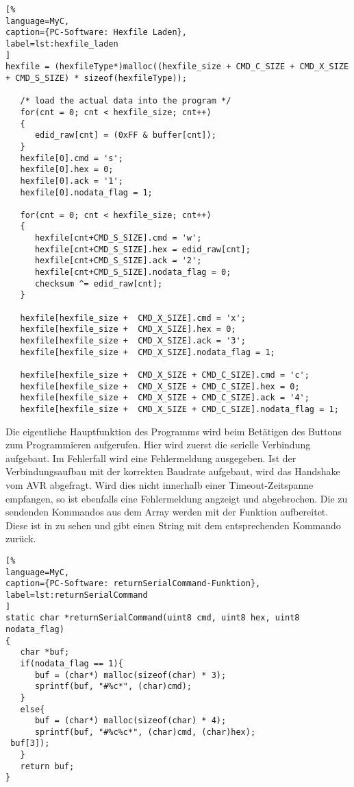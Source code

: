 \begin{lstlisting}[%
language=MyC,
caption={PC-Software: Hexfile Laden},
label=lst:hexfile_laden
]
hexfile = (hexfileType*)malloc((hexfile_size + CMD_C_SIZE + CMD_X_SIZE + CMD_S_SIZE) * sizeof(hexfileType));

   /* load the actual data into the program */
   for(cnt = 0; cnt < hexfile_size; cnt++)
   {
      edid_raw[cnt] = (0xFF & buffer[cnt]);
   }
   hexfile[0].cmd = 's';
   hexfile[0].hex = 0;
   hexfile[0].ack = '1';
   hexfile[0].nodata_flag = 1;

   for(cnt = 0; cnt < hexfile_size; cnt++)
   {
      hexfile[cnt+CMD_S_SIZE].cmd = 'w';
      hexfile[cnt+CMD_S_SIZE].hex = edid_raw[cnt];
      hexfile[cnt+CMD_S_SIZE].ack = '2';
      hexfile[cnt+CMD_S_SIZE].nodata_flag = 0;
      checksum ^= edid_raw[cnt];
   }

   hexfile[hexfile_size +  CMD_X_SIZE].cmd = 'x';
   hexfile[hexfile_size +  CMD_X_SIZE].hex = 0;
   hexfile[hexfile_size +  CMD_X_SIZE].ack = '3';
   hexfile[hexfile_size +  CMD_X_SIZE].nodata_flag = 1;

   hexfile[hexfile_size +  CMD_X_SIZE + CMD_C_SIZE].cmd = 'c';
   hexfile[hexfile_size +  CMD_X_SIZE + CMD_C_SIZE].hex = 0;
   hexfile[hexfile_size +  CMD_X_SIZE + CMD_C_SIZE].ack = '4';
   hexfile[hexfile_size +  CMD_X_SIZE + CMD_C_SIZE].nodata_flag = 1;
\end{lstlisting}%
Die eigentliche Hauptfunktion des Programms wird beim Betätigen des Buttons zum Programmieren aufgerufen. Hier wird zuerst die serielle Verbindung aufgebaut. Im Fehlerfall wird eine Fehlermeldung ausgegeben. Ist der Verbindungsaufbau mit der korrekten Baudrate aufgebaut, wird das Handshake vom AVR abgefragt. Wird dies nicht innerhalb einer Timeout-Zeitspanne empfangen, so ist ebenfalls eine Fehlermeldung angzeigt und abgebrochen. Die zu sendenden Kommandos aus dem Array  werden mit der Funktion  aufbereitet. Diese ist in  zu sehen und gibt einen String mit dem entsprechenden Kommando zurück. 
\begin{lstlisting}[%
language=MyC,
caption={PC-Software: returnSerialCommand-Funktion},
label=lst:returnSerialCommand
]
static char *returnSerialCommand(uint8 cmd, uint8 hex, uint8 nodata_flag)
{
   char *buf;
   if(nodata_flag == 1){
      buf = (char*) malloc(sizeof(char) * 3);
      sprintf(buf, "#%c*", (char)cmd);
   }
   else{
      buf = (char*) malloc(sizeof(char) * 4);
      sprintf(buf, "#%c%c*", (char)cmd, (char)hex);
 buf[3]);
   }
   return buf;
}
\end{lstlisting}%
